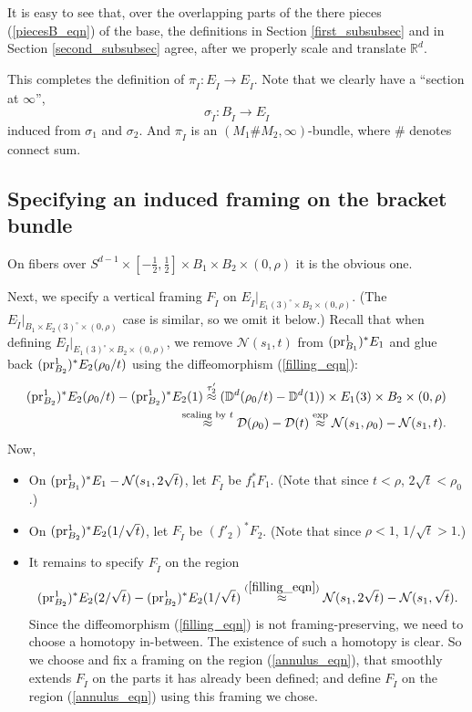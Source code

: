 \documentclass[11pt]{article}
\theoremstyle{definition}
\theoremstyle{remark}
\def\R{\mathbb{R}}
\def\D{\mathbb{D}}
\def\cN{\mathcal{N}}
\def\rI{{\mathring{I}}}
\def\tn#1{\textnormal{#1}}
\def\pr{{\textnormal{pr}}}
\begin{document}
It is easy to see that, over the overlapping parts of the there pieces (\ref{piecesB_eqn}) of the base, the definitions in Section \ref{first_subsubsec} and in Section \ref{second_subsubsec} agree, after we properly scale and translate $\R^d$. 

This completes the definition of $\pi_\rI:E_\rI\to E_\rI$. 
Note that we clearly have a ``section at $\infty$'', 
$$\sigma_\rI:B_\rI\longrightarrow E_\rI$$
induced from $\sigma_1$ and $\sigma_2$. 
And $\pi_\rI$ is an $(M_1\#M_2,\infty)$-bundle, where $\#$ denotes connect sum. 


\subsection{Specifying an induced framing on the bracket bundle}

On fibers over $S^{d-1}\times[-\frac{1}{2},\frac{1}{2}]\times B_1\times B_2\times(0,\rho)$ it is the obvious one. 

Next, we specify a vertical framing $F_\rI$ on $E_\rI|_{E_1(3)^\circ\times B_2\times (0,\rho)}$. 
(The $E_\rI|_{B_1\times E_2(3)^\circ\times (0,\rho)}$ case is similar, so we omit it below.)
Recall that when defining $E_\rI|_{E_1(3)^\circ\times B_2\times (0,\rho)}$, we remove $\cN(s_1,t)$ from $(\pr^1_{B_1})^*E_1$ and glue back $(\pr^1_{B_2})^*E_2(\rho_0/t)$ using the diffeomorphism (\ref{filling_eqn}): 
\begin{align*}
(\pr^1_{B_2})^*E_2(\rho_0/t)-(\pr^1_{B_2})^*E_2(1)\stackrel{\tau'_2}{\approx}(\D^d(\rho_0/t)-\D^d(1))\times E_1(3)\times B_2\times(0,\rho) \nonumber\\
\stackrel{\tn{scaling by }t}{\approx}\mathcal{D}(\rho_0)-\mathcal{D}(t)\stackrel{\exp}{\approx}\cN(s_1,\rho_0)-\cN(s_1,t).
\end{align*}
Now, 
\begin{itemize}
\item On $(\pr^1_{B_1})^*E_1-\cN(s_1,2\sqrt{t})$, let $F_\rI$ be $f_1^*F_1$. (Note that since $t<\rho$, $2\sqrt{t}<\rho_0$.)
\item On $(\pr^1_{B_2})^*E_2(1/\sqrt{t})$, let $F_\rI$ be $(f'_2)^*F_2$. (Note that since $\rho<1$, $1/\sqrt{t}>1$.)
\item It remains to specify $F_\rI$ on the region
\begin{equation}\label{annulus_eqn}
(\pr^1_{B_2})^*E_2(2/\sqrt{t})-(\pr^1_{B_2})^*E_2(1/\sqrt{t})\stackrel{(\ref{filling_eqn})}{\approx}\cN(s_1,2\sqrt{t})-\cN(s_1,\sqrt{t}).
\end{equation}
Since the diffeomorphism (\ref{filling_eqn}) is not framing-preserving, we need to choose a homotopy in-between. 
The existence of such a homotopy is clear. So we choose and fix a framing on the region (\ref{annulus_eqn}), that smoothly extends $F_\rI$ on the parts it has already been defined; and define $F_\rI$ on the region (\ref{annulus_eqn}) using this framing we chose. 
\end{itemize}
\end{document}
